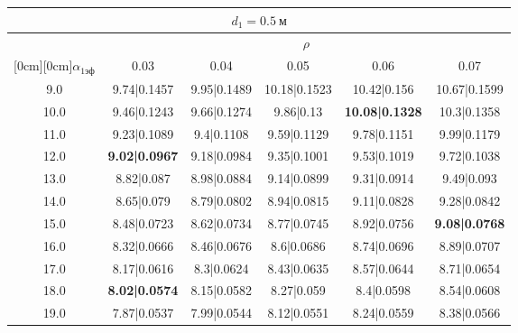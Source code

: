 \documentclass[20pt]{article}
\begin{document}
\begin{center}
\begin{tabular}{c|ccccc}
\hline
	\multicolumn{6}{c}{$d_{1}=0.5 \ м$} \\
\hline
	 & \multicolumn{5}{|c}{$\rho$} \\
	\cline{2-6}
	\raisebox{1.5ex}[0cm][0cm]{$\alpha_{1эф}$} & 0.03 & 0.04 & 0.05 & 0.06 & 0.07\\
\hline
	9.0 & 	9.74|0.1457 & 	9.95|0.1489 & 	10.18|0.1523 & 	10.42|0.156 & 	10.67|0.1599\\
	10.0 & 	9.46|0.1243 & 	9.66|0.1274 & 	9.86|0.13 & 	\textbf{10.08|0.1328} & 	10.3|0.1358\\
	11.0 & 	9.23|0.1089 & 	9.4|0.1108 & 	9.59|0.1129 & 	9.78|0.1151 & 	9.99|0.1179\\
	12.0 & 	\textbf{9.02|0.0967} & 	9.18|0.0984 & 	9.35|0.1001 & 	9.53|0.1019 & 	9.72|0.1038\\
	13.0 & 	8.82|0.087 & 	8.98|0.0884 & 	9.14|0.0899 & 	9.31|0.0914 & 	9.49|0.093\\
	14.0 & 	8.65|0.079 & 	8.79|0.0802 & 	8.94|0.0815 & 	9.11|0.0828 & 	9.28|0.0842\\
	15.0 & 	8.48|0.0723 & 	8.62|0.0734 & 	8.77|0.0745 & 	8.92|0.0756 & 	\textbf{9.08|0.0768}\\
	16.0 & 	8.32|0.0666 & 	8.46|0.0676 & 	8.6|0.0686 & 	8.74|0.0696 & 	8.89|0.0707\\
	17.0 & 	8.17|0.0616 & 	8.3|0.0624 & 	8.43|0.0635 & 	8.57|0.0644 & 	8.71|0.0654\\
	18.0 & 	\textbf{8.02|0.0574} & 	8.15|0.0582 & 	8.27|0.059 & 	8.4|0.0598 & 	8.54|0.0608\\
	19.0 & 	7.87|0.0537 & 	7.99|0.0544 & 	8.12|0.0551 & 	8.24|0.0559 & 	8.38|0.0566\\
\end{tabular}


\end{center}
\end{document}
